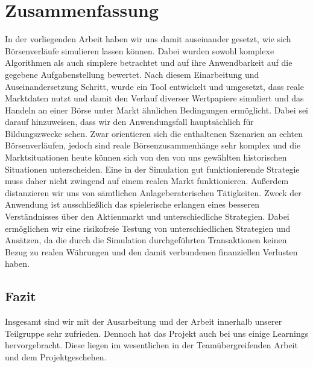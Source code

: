 \chapter{Zusammenfassung}

In der vorliegenden Arbeit haben wir uns damit auseinander gesetzt, wie sich Börsenverläufe simulieren lassen können. Dabei wurden sowohl komplexe Algorithmen als auch simplere betrachtet und auf ihre Anwendbarkeit auf die gegebene Aufgabenstellung bewertet. Nach diesem Einarbeitung und Auseinandersetzung Schritt, wurde ein Tool entwickelt und umgesetzt, dass reale Marktdaten nutzt und damit den Verlauf diverser Wertpapiere simuliert und das Handeln an einer Börse unter Markt ähnlichen Bedingungen ermöglicht. Dabei sei darauf hinzuweisen, dass wir den Anwendungsfall hauptsächlich für Bildungszwecke sehen. Zwar orientieren sich die enthaltenen Szenarien an echten Börsenverläufen, jedoch sind reale Börsenzusammenhänge sehr komplex und die Marktsituationen heute können sich von den von uns gewählten historischen Situationen unterscheiden. Eine in der Simulation gut funktionierende Strategie muss daher nicht zwingend auf einem realen Markt funktionieren. Außerdem distanzieren wir uns von sämtlichen Anlageberaterischen Tätigkeiten. Zweck der Anwendung ist ausschließlich das spielerische erlangen eines besseren Verständnisses über den Aktienmarkt und unterschiedliche Strategien. Dabei ermöglichen wir eine risikofreie Testung von unterschiedlichen Strategien und Ansätzen, da die durch die Simulation durchgeführten Transaktionen keinen Bezug zu realen Währungen und den damit verbundenen finanziellen Verlusten haben. 

\section{Fazit}
Insgesamt sind wir mit der Ausarbeitung und der Arbeit innerhalb unserer Teilgruppe sehr zufrieden. Dennoch hat das Projekt auch bei uns einige Learnings hervorgebracht. Diese liegen im wesentlichen in der Teamübergreifenden Arbeit und dem Projektgeschehen. 

